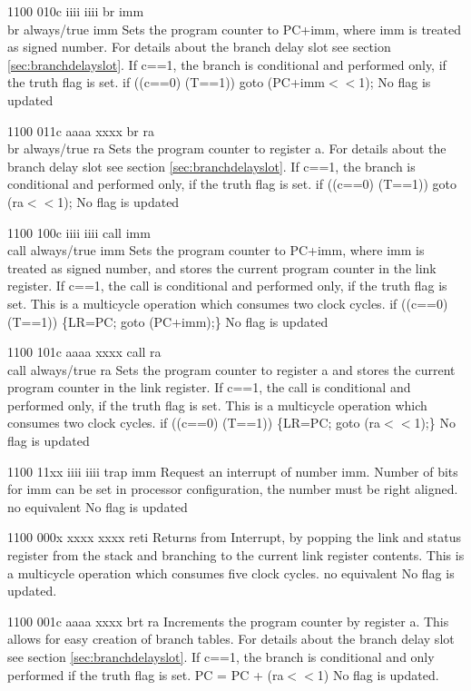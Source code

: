 	{1100 010c iiii iiii}
	{br imm\\br always/true imm}
	{Sets the program counter to PC+imm, where imm is treated as signed number. For details about the branch delay slot see section \ref{sec:branchdelayslot}. If c==1, the branch is conditional and performed only, if the truth flag is set.}
	{if ((c==0) \logicor (T==1)) goto (PC+imm$<<$1);}
	{No flag is updated}

	{1100 011c aaaa xxxx}
	{br ra\\br always/true ra}
	{Sets the program counter to register a. For details about the branch delay slot see section \ref{sec:branchdelayslot}. If c==1, the branch is conditional and performed only, if the truth flag is set.}
	{if ((c==0) \logicor (T==1)) goto (ra$<<$1);}
	{No flag is updated}
	
	{1100 100c iiii iiii}
	{call imm\\call always/true imm}
	{Sets the program counter to PC+imm, where imm is treated as signed number, and stores the current program counter in the link register. If c==1, the call is conditional and performed only, if the truth flag is set. This is a multicycle operation which consumes two clock cycles.}
	{if ((c==0) \logicor (T==1)) \{LR=PC; goto (PC+imm);\}}
	{No flag is updated}
	
	{1100 101c aaaa xxxx}
	{call ra\\call always/true ra}
	{Sets the program counter to register a and stores the current program counter in the link register. If c==1, the call is conditional and performed only, if the truth flag is set. This is a multicycle operation which consumes two clock cycles.}
	{if ((c==0) \logicor (T==1)) \{LR=PC; goto (ra$<<$1);\}}
	{No flag is updated}

	{1100 11xx iiii iiii}
	{trap imm}
	{Request an interrupt of number imm. Number of bits for imm can be set in processor configuration, the number must be right aligned.}
	{no equivalent}
	{No flag is updated}

	{1100 000x xxxx xxxx}
	{reti}
	{Returns from Interrupt, by popping the link and status register from the stack and branching to the current link register contents. This is a multicycle operation which consumes five clock cycles.}
	{no equivalent}
	{No flag is updated.}

	{1100 001c aaaa xxxx}
	{brt ra}
	{Increments the program counter by register a. This allows for easy creation of branch tables. For details about the branch delay slot see section \ref{sec:branchdelayslot}. If c==1, the branch is conditional and only performed if the truth flag is set.}
	{PC = PC + (ra$<<$1)}
	{No flag is updated.}

